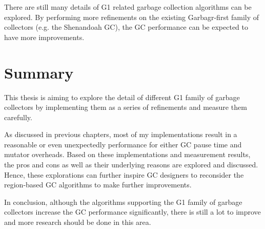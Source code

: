 There are still many details of G1 related garbage collection algorithms can be
explored. By performing more refinements on the existing Garbagr-first family of collectors
(e.g. the Shenandoah GC), the GC performance can be expected to have more improvements.

\section{Summary}

This thesis is aiming to explore the detail of different G1 family of garbage collectors
by implementing them as a series of refinements and measure them carefully.

As discussed in previous chapters, most of my implementations result in a reasonable
or even unexpectedly performance for either GC pause time and mutator overheads.
Based on these implementations and measurement results, the pros and cons as well
as their underlying reasons are explored and discussed. Hence, these explorations can
further inspire GC designers to reconsider the region-based GC algorithms to make
further improvements.

In conclusion, although the algorithms supporting the G1 family of garbage collectors
increase the GC performance significantly, there is still a lot to improve and more research
should be done in this area.





